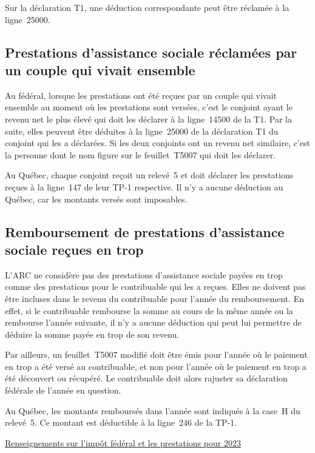 Sur la déclaration T1, une déduction correspondante peut être réclamée à la ligne~25000.


\subsection{Prestations d'assistance sociale réclamées par un couple qui vivait ensemble}
Au fédéral, lorsque les prestations ont été reçues par un couple qui vivait ensemble au moment où les prestations sont versées, c'est le conjoint ayant le revenu net le plus élevé qui doit les déclarer à la ligne~14500 de la T1. Par la suite, elles peuvent être déduites à la ligne~25000 de la déclaration T1 du conjoint qui les a déclarées. Si les deux conjoints ont un revenu net similaire, c'est la personne dont le nom figure sur le feuillet~T5007 qui doit les déclarer.

Au Québec, chaque conjoint reçoit un relevé~5 et doit déclarer les prestations reçues à la ligne~147 de leur TP-1 respective. Il n'y a aucune déduction au Québec, car les montants versés sont imposables. 


\subsection{Remboursement de prestations d'assistance sociale reçues en trop}
L'ARC ne considère pas des prestations d'assistance sociale payées en trop comme des prestations pour le contribuable qui les a reçues. Elles ne doivent pas être incluses dans le revenu du contribuable pour l'année du remboursement. En effet, si le contribuable rembourse la somme au cours de la même année ou la rembourse l'année suivante, il n'y a aucune déduction qui peut lui permettre de déduire la somme payée en trop de son revenu.

Par ailleurs, un feuillet~T5007 modifié doit être émis pour l'année où le paiement en trop a été versé au contribuable, et non pour l'année où le paiement en trop a été découvert ou récupéré. Le contribuable doit alors rajuster sa déclaration fédérale de l'année en question. 

Au Québec, les montants remboursés dans l'année sont indiqués à la case~H du relevé~5. Ce montant est déductible à la ligne~246 de la TP-1. 

\cat\href{https://www.canada.ca/fr/agence-revenu/services/formulaires-publications/trousses-impot-toutes-annees-imposition/trousse-generale-impot-prestations/5000-g.html}{Renseignements sur l'impôt fédéral et les prestations pour 2023}

